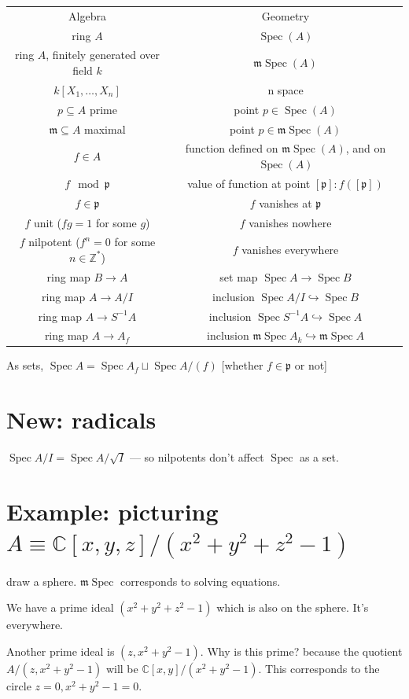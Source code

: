 \documentclass{book}
\newcommand{\Z}{\ensuremath{\mathbb{Z}}}
\newcommand{\C}{\ensuremath{\mathbb{C}}}
\newcommand{\spec}{\operatorname{Spec}}
\newcommand{\m}{\mathfrak{m}}
\newcommand{\p}{\mathfrak{p}}
\newcommand{\mspec}{\m\operatorname{Spec}}
\newcommand{\inv}{\ensuremath{-1}}
\theoremstyle{definition}
\begin{document}
\begin{tabular}{cc}
Algebra & Geometry \\
ring $A$ & $\spec(A)$ \\
ring $A$, finitely generated over field $k$ & $\mspec(A)$ \\
$k[X_1, \dots, X_n]$ & n space \\
$p \subseteq A$ prime & point $p \in \spec(A)$ \\
\(\m \subseteq A\) maximal & point \(p \in \mspec(A)\) \\
$f \in A$ &  function defined on $\mspec(A)$, and on $\spec(A)$ \\
$f \mod \p$ &  value of function  at point $[\p]: f([\p])$ \\
$f \in \p$ &  $f$ vanishes at $\p$  \\
$f$ unit ($fg = 1$ for some $g$) &  $f$ vanishes nowhere \\
$f$ nilpotent ($f^n = 0$ for some $n \in \Z^*$) &  $f$ vanishes everywhere \\
ring map $B \rightarrow A$ & set map $\spec A \rightarrow \spec B$ \\
ring map $A \rightarrow A/I$ & inclusion $\spec A/I \hookrightarrow \spec B$ \\
ring map $A \rightarrow S^\inv A$ & inclusion $\spec S^\inv A \hookrightarrow \spec A$ \\
ring map $A \rightarrow A_f$ & inclusion $\mspec A_k \hookrightarrow \mspec A$ \\
\end{tabular}

As sets, $\spec A = \spec A_f \sqcup \spec A/(f)$ [whether $f \in \p$ or not]

\section{New: radicals}
$\spec A/I = \spec A/\sqrt{I}$ --- so nilpotents don't affect $\spec$ as a set.

\section{Example: picturing $A \equiv \C[x, y, z]/ (x^2 + y^2 + z^2 - 1)$}
draw a sphere. $\mspec$ corresponds to solving equations. 

We have a prime ideal $(x^2 + y^2 + z^2 - 1)$ which is also on the sphere.
It's everywhere. 


Another prime ideal is $(z, x^2 + y^2 - 1)$. Why is this prime? because
the quotient $A/ (z, x^2 + y^2 - 1)$ will be $\C[x, y] / (x^2 + y^2 - 1)$.
This corresponds to the circle $z = 0, x^2 + y^2 - 1 = 0$.
\end{document}
